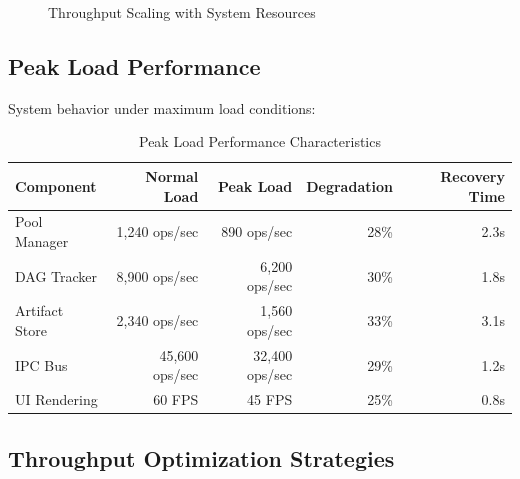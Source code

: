\begin{figure}[htb]
\centering
{}
\caption{Throughput Scaling with System Resources}
\label{fig:throughput-scaling}
\end{figure}

\subsection*{Peak Load Performance}

System behavior under maximum load conditions:

\begin{table}[ht]
\centering
\caption{Peak Load Performance Characteristics}
\label{tab:peak-load}
\begin{tabular}{@{}lrrrr@{}}
\toprule
\textbf{Component} & \textbf{Normal Load} & \textbf{Peak Load} & \textbf{Degradation} & \textbf{Recovery Time} \\
\midrule
Pool Manager & 1,240 ops/sec & 890 ops/sec & 28\% & 2.3s \\
DAG Tracker & 8,900 ops/sec & 6,200 ops/sec & 30\% & 1.8s \\
Artifact Store & 2,340 ops/sec & 1,560 ops/sec & 33\% & 3.1s \\
IPC Bus & 45,600 ops/sec & 32,400 ops/sec & 29\% & 1.2s \\
UI Rendering & 60 FPS & 45 FPS & 25\% & 0.8s \\
\bottomrule
\end{tabular}
\end{table}

\subsection*{Throughput Optimization Strategies}

